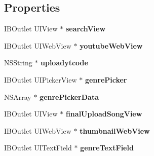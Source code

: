 \subsection*{Properties}
\begin{DoxyCompactItemize}
\item 
\hypertarget{interface_c_b_h_view_controller_a64e881cd5979df2a2e1395aca5577d64}{I\-B\-Outlet U\-I\-View $\ast$ {\bfseries search\-View}}\label{interface_c_b_h_view_controller_a64e881cd5979df2a2e1395aca5577d64}

\item 
\hypertarget{interface_c_b_h_view_controller_a463820dea5eb85e6d2275a8ea9c69fbf}{I\-B\-Outlet U\-I\-Web\-View $\ast$ {\bfseries youtube\-Web\-View}}\label{interface_c_b_h_view_controller_a463820dea5eb85e6d2275a8ea9c69fbf}

\item 
\hypertarget{interface_c_b_h_view_controller_a957f415cf4ea49ddcb4b00d5c4c7881e}{N\-S\-String $\ast$ {\bfseries uploadytcode}}\label{interface_c_b_h_view_controller_a957f415cf4ea49ddcb4b00d5c4c7881e}

\item 
\hypertarget{interface_c_b_h_view_controller_ae5b2756df0c2a7615601923043519dea}{I\-B\-Outlet U\-I\-Picker\-View $\ast$ {\bfseries genre\-Picker}}\label{interface_c_b_h_view_controller_ae5b2756df0c2a7615601923043519dea}

\item 
\hypertarget{interface_c_b_h_view_controller_a42054403ea069b1f964e74a08fc429a9}{N\-S\-Array $\ast$ {\bfseries genre\-Picker\-Data}}\label{interface_c_b_h_view_controller_a42054403ea069b1f964e74a08fc429a9}

\item 
\hypertarget{interface_c_b_h_view_controller_a0b3711ade53cab7f4dedffb3bfd1a4c3}{I\-B\-Outlet U\-I\-View $\ast$ {\bfseries final\-Upload\-Song\-View}}\label{interface_c_b_h_view_controller_a0b3711ade53cab7f4dedffb3bfd1a4c3}

\item 
\hypertarget{interface_c_b_h_view_controller_ac45c42f77d2b9716de9121d17d03b2a3}{I\-B\-Outlet U\-I\-Web\-View $\ast$ {\bfseries thumbnail\-Web\-View}}\label{interface_c_b_h_view_controller_ac45c42f77d2b9716de9121d17d03b2a3}

\item 
\hypertarget{interface_c_b_h_view_controller_a3e84c0f2fe5a22a12e9798b7db14d558}{I\-B\-Outlet U\-I\-Text\-Field $\ast$ {\bfseries genre\-Text\-Field}}\label{interface_c_b_h_view_controller_a3e84c0f2fe5a22a12e9798b7db14d558}


\end{DoxyCompactItemize}
